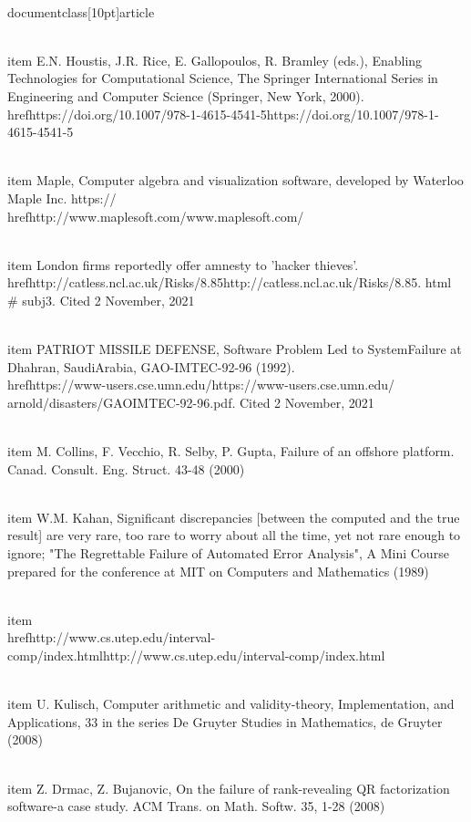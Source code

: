 \\documentclass[10pt]{article}
\begin{document}
  \\item E.N. Houstis, J.R. Rice, E. Gallopoulos, R. Bramley (eds.), Enabling Technologies for Computational Science, The Springer International Series in Engineering and Computer Science (Springer, New York, 2000). \\href{https://doi.org/10.1007/978-1-4615-4541-5}{https://doi.org/10.1007/978-1-4615-4541-5}

  \\item Maple, Computer algebra and visualization software, developed by Waterloo Maple Inc. https:// \\href{http://www.maplesoft.com/}{www.maplesoft.com/}

  \\item London firms reportedly offer amnesty to 'hacker thieves'. \\href{http://catless.ncl.ac.uk/Risks/8.85}{http://catless.ncl.ac.uk/Risks/8.85}. html\\# subj3. Cited 2 November, 2021

  \\item PATRIOT MISSILE DEFENSE, Software Problem Led to SystemFailure at Dhahran, SaudiArabia, GAO-IMTEC-92-96 (1992). \\href{https://www-users.cse.umn.edu/}{https://www-users.cse.umn.edu/} arnold/disasters/GAOIMTEC-92-96.pdf. Cited 2 November, 2021

  \\item M. Collins, F. Vecchio, R. Selby, P. Gupta, Failure of an offshore platform. Canad. Consult. Eng. Struct. 43-48 (2000)

  \\item W.M. Kahan, Significant discrepancies [between the computed and the true result] are very rare, too rare to worry about all the time, yet not rare enough to ignore; "The Regrettable Failure of Automated Error Analysis", A Mini Course prepared for the conference at MIT on Computers and Mathematics (1989)

  \\item \\href{http://www.cs.utep.edu/interval-comp/index.html}{http://www.cs.utep.edu/interval-comp/index.html}

  \\item U. Kulisch, Computer arithmetic and validity-theory, Implementation, and Applications, 33 in the series De Gruyter Studies in Mathematics, de Gruyter (2008)

  \\item Z. Drmac, Z. Bujanovic, On the failure of rank-revealing QR factorization software-a case study. ACM Trans. on Math. Softw. 35, 1-28 (2008)
\end{document}
